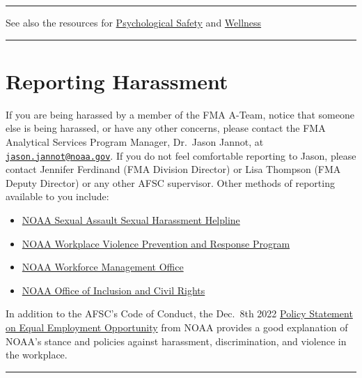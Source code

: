 \documentclass[
  letterpaper,
  DIV=11,
  numbers=noendperiod]{scrreprt}
\providecommand{\tightlist}{%
  \setlength{\itemsep}{0pt}\setlength{\parskip}{0pt}}\usepackage{longtable,booktabs,array}
\begin{document}
\begin{center}\rule{0.5\linewidth}{0.5pt}\end{center}

See also the resources for \hyperref[psych-safety]{Psychological Safety}
and \href{wellness-resources.qmd}{Wellness}

\begin{center}\rule{0.5\linewidth}{0.5pt}\end{center}

\section{Reporting Harassment}\label{reporting-harassment}

If you are being harassed by a member of the FMA A-Team, notice that
someone else is being harassed, or have any other concerns, please
contact the FMA Analytical Services Program Manager, Dr.~Jason Jannot,
at
\href{mailto:jason.jannot@noaa.gov}{\nolinkurl{jason.jannot@noaa.gov}}.
If you do not feel comfortable reporting to Jason, please contact
Jennifer Ferdinand (FMA Division Director) or Lisa Thompson (FMA Deputy
Director) or any other AFSC supervisor. Other methods of reporting
available to you include:

\begin{itemize}
\tightlist
\item
  \href{https://noaasashhelpline.org/}{NOAA Sexual Assault Sexual
  Harassment Helpline}
\item
  \href{https://www.noaa.gov/workplace-violence-prevention-response-program}{NOAA
  Workplace Violence Prevention and Response Program}
\item
  \href{mailto:DAO-955.OHCS@noaa.gov}{NOAA Workforce Management Office}
\item
  \href{mailto:noaa.oicr@noaa.gov}{NOAA Office of Inclusion and Civil
  Rights}
\end{itemize}

In addition to the AFSC's Code of Conduct, the Dec.~8th 2022
\href{https://www.noaa.gov/organization/inclusion-and-civil-rights/policy-statement-on-equal-employment-opportunity}{Policy
Statement on Equal Employment Opportunity} from NOAA provides a good
explanation of NOAA's stance and policies against harassment,
discrimination, and violence in the workplace.

\begin{center}\rule{0.5\linewidth}{0.5pt}\end{center}
\end{document}
